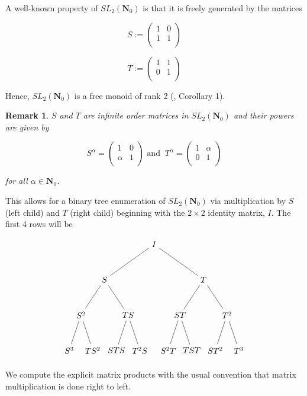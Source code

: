 \documentclass{article}
\newtheorem{remark}[theorem]{Remark}  %
\begin{document}
A well-known property of $SL_2(\mathbf{N}_0)$ is that it is freely generated by the matrices

$$S := 
\begin{pmatrix}
    1 & 0 \\
    1 & 1 \\
\end{pmatrix}$$

$$T := 
\begin{pmatrix}
    1 & 1 \\
    0 & 1 \\
\end{pmatrix}$$


Hence, $SL_2(\mathbf{N}_0)$ is a free monoid of rank 2 (\cite{nathanson2014forest}, Corollary 1).

\begin{remark}
$S$ and $T$ are infinite order matrices in $SL_2(\mathbf{N}_0)$ and their powers are given by

$$S^\alpha = \begin{pmatrix}
    1 & 0 \\
    \alpha & 1 \\
\end{pmatrix} \text{ and  } \ T^\alpha = \begin{pmatrix}
    1 & \alpha \\
    0 & 1 \\
\end{pmatrix}$$

for all $\alpha \in \mathbf{N}_0$.
\end{remark}

This allows for a binary tree enumeration of $SL_2(\mathbf{N}_0)$ via multiplication by $S$ (left child) and $T$ (right child) beginning with the $2 \times 2$ identity matrix, $I$. The first 4 rows will be

$$\begin{tikzpicture}[level distance=15mm,
level 1/.style={sibling distance=42mm},
level 2/.style={sibling distance=20mm},
level 3/.style={sibling distance=10mm}]
\node {$I$}
child {
node {$S$}
child {
node {$S^2$}
child {node {$S^3$}}
child {node {$TS^2$}}
}
child {
node {$TS$}
child {node {$STS$}}
child {node {$T^2S$}}
}
}
child {
node {$T$}
child {
node {$ST$}
child {node {$S^2T$}}
child {node {$TST$}}
}
child {
node {$T^2$}
child {node {$ST^2$}}
child {node {$T^3$}}
}
} ;
\end{tikzpicture}$$

We compute the explicit matrix products with the usual convention that matrix multiplication is done right to left.
\end{document}
